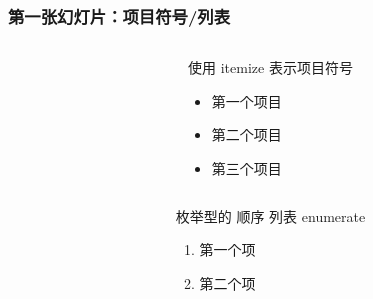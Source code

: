 \begin{frame}[fragile]
  \frametitle{第一张幻灯片：项目符号/列表}
  \begin{columns}
    \begin{column}{0.51\textwidth}
      
    \end{column}
    \begin{column}{0.49\textwidth}
      使用 itemize 表示项目符号
  
      \begin{itemize}
      \item 第一个项目
      \item 第二个项目
      \item 第三个项目
      \end{itemize}
    \end{column}
  \end{columns}

  \begin{columns}
    \begin{column}{0.51\textwidth}
      
    \end{column}
    \begin{column}{0.49\textwidth}
      枚举型的 顺序 列表 enumerate
  
      \begin{enumerate}
      \item 第一个项
      \item 第二个项
      \end{enumerate}
    \end{column}
  \end{columns}

\end{frame}

